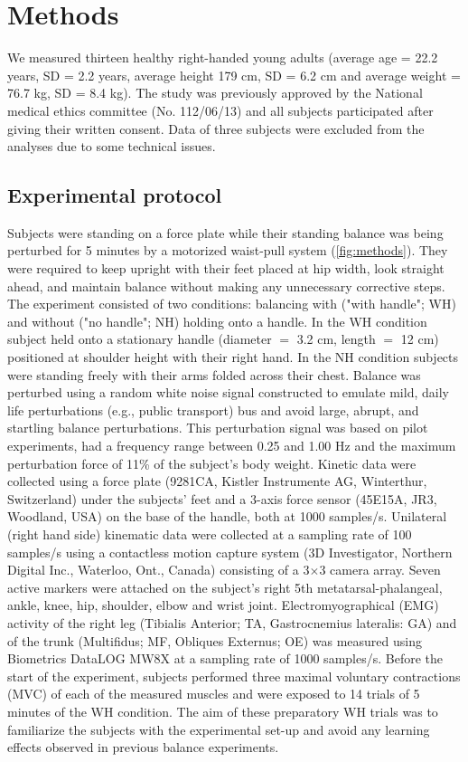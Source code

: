 \section{Methods}
We measured thirteen healthy right-handed young adults (average age = 22.2 years, SD = 2.2 years, average height 179 cm, SD = 6.2 cm and average weight = 76.7 kg, SD = 8.4 kg). The study was previously approved by the National medical ethics committee (No. 112/06/13) and all subjects participated after giving their written consent. Data of three subjects were  excluded from the analyses due to some technical issues.

\subsection{Experimental protocol}
Subjects were standing on a force plate while their standing balance was being perturbed for 5 minutes by a motorized waist-pull system \cite{Peternel2013} (\FigureAbbr \ref{fig:methods}). They were required to keep upright with their feet placed at hip width, look straight ahead, and maintain balance without making any unnecessary corrective steps. The experiment consisted of two conditions: balancing with ("with handle"; WH) and without ("no handle"; NH) holding onto a handle. In the WH condition subject held onto a stationary handle (diameter $=$ 3.2 cm, length $=$ 12 cm) positioned at shoulder height \cite{Babic2014b} with their right hand. In the NH condition subjects were standing freely with their arms folded across their chest. 
Balance was perturbed using a random white noise signal constructed to emulate mild, daily life perturbations (e.g., public transport) bus and avoid large, abrupt, and startling balance perturbations. This perturbation signal was based on pilot experiments, had a frequency range between 0.25 and 1.00 Hz and the maximum perturbation force of 11\% of the subject's body weight. 
Kinetic data were collected using a force plate (9281CA, Kistler Instrumente AG, Winterthur, Switzerland) under the subjects’ feet and a 3-axis force sensor (45E15A, JR3, Woodland, USA) on the base of the handle, both at 1000 samples/s. Unilateral  (right hand side) kinematic data were collected at a sampling rate of 100 samples/s using a contactless motion capture system (3D Investigator, Northern Digital Inc., Waterloo, Ont., Canada) consisting of a 3$\times$3 camera array. Seven active markers were attached on the subject's right 5th metatarsal-phalangeal, ankle, knee, hip, shoulder, elbow and wrist joint. Electromyographical (EMG) activity of the right leg (Tibialis Anterior; TA, Gastrocnemius lateralis: GA) and of the trunk (Multifidus; MF, Obliques Externus; OE) was measured using Biometrics DataLOG MW8X at a sampling rate of 1000 samples/s. 
Before the start of the experiment, subjects performed three maximal voluntary contractions (MVC) of each of the measured muscles and were exposed to 14 trials of 5 minutes of the WH condition. The aim of these preparatory WH trials was to familiarize the subjects with the experimental set-up and avoid any learning effects observed in previous balance experiments.

